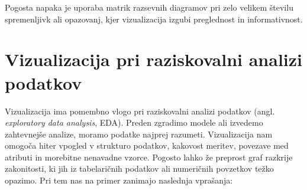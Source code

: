 Pogosta napaka je uporaba matrik razsevnih diagramov pri zelo velikem številu spremenljivk ali opazovanj, kjer vizualizacija izgubi preglednost in informativnost.



\section{Vizualizacija pri raziskovalni analizi podatkov}

Vizualizacija ima pomembno vlogo pri raziskovalni analizi podatkov (angl. \emph{exploratory data analysis}, EDA). Preden zgradimo modele ali izvedemo zahtevnejše analize, moramo podatke najprej razumeti. Vizualizacija nam omogoča hiter vpogled v strukturo podatkov, kakovost meritev, povezave med atributi in morebitne nenavadne vzorce. Pogosto lahko že preprost graf razkrije zakonitosti, ki jih iz tabelaričnih podatkov ali numeričnih povzetkov težko opazimo. Pri tem nas na primer zanimajo naslednja vprašanja:
%
